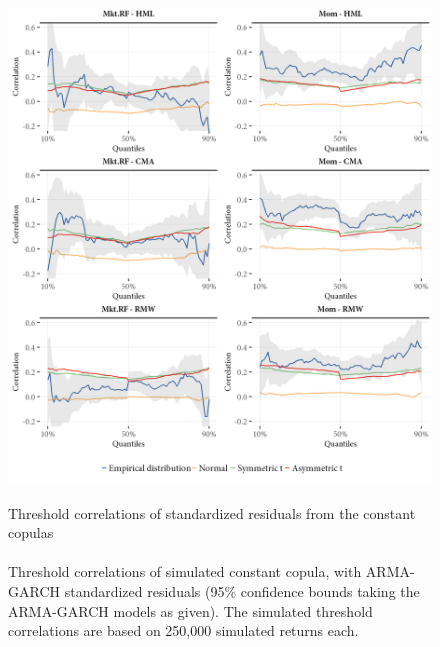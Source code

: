 \begin{figure}[!ht]
  \centering
  \caption{Threshold correlations of standardized residuals from the constant copulas \\ \quad \\ Threshold correlations of simulated constant copula, with ARMA-GARCH standardized residuals (95\% confidence bounds taking the ARMA-GARCH models as given). The simulated threshold correlations are based on 250,000 simulated returns each.}
  \includegraphics[scale=1]{graphics/threshold_simulated_1.png}  
  \label{fig:threshold_simulated1}
\end{figure}
